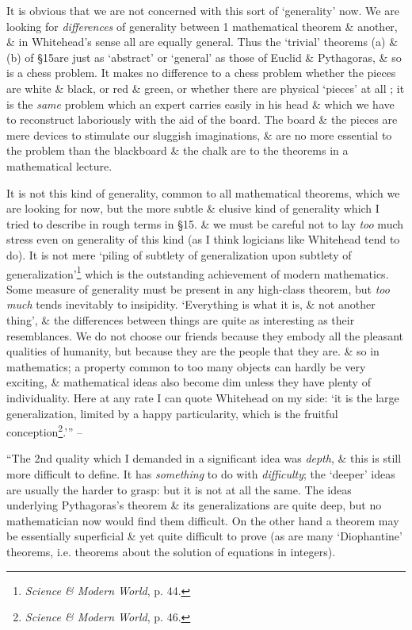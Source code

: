 \documentclass{article}
\numberwithin{equation}{section}
\begin{document}
It is obvious that we are not concerned with this sort of `generality' now. We are looking for \textit{differences} of generality between 1 mathematical theorem \& another, \& in Whitehead's sense all are equally general. Thus the `trivial' theorems (a) \& (b) of \S15are just as `abstract' or `general' as those of Euclid \& Pythagoras, \& so is a chess problem. It makes no difference to a chess problem whether the pieces are white \& black, or red \& green, or whether there are physical `pieces' at all ; it is the \textit{same} problem which an expert carries easily in his head \& which we have to reconstruct laboriously with the aid of the board. The board \& the pieces are mere devices to stimulate our sluggish imaginations, \& are no more essential to the problem than the blackboard \& the chalk are to the theorems in a mathematical lecture.

It is not this kind of generality, common to all mathematical theorems, which we are looking for now, but the more subtle \& elusive kind of generality which I tried to describe in rough terms in \S15. \& we must be careful not to lay \textit{too} much stress even on generality of this kind (as I think logicians like Whitehead tend to do). It is not mere `piling of subtlety of generalization upon subtlety of generalization'\footnote{\textit{Science \& Modern World}, p. 44.} which is the outstanding achievement of modern mathematics. Some measure of generality must be present in any high-class theorem, but \textit{too much} tends inevitably to insipidity. `Everything is what it is, \& not another thing', \& the differences between things are quite as interesting as their resemblances. We do not choose our friends because they embody all the pleasant qualities of humanity, but because they are the people that they are. \& so in mathematics; a property common to too many objects can hardly be very exciting, \& mathematical ideas also become dim unless they have plenty of individuality. Here at any rate I can quote Whitehead on my side: `it is the large generalization, limited by a happy particularity, which is the fruitful conception\footnote{\textit{Science \& Modern World}, p. 46.}.''' -- \cite[pp. 105--109]{Hardy1992}

 ``The 2nd quality which I demanded in a significant idea was \textit{depth}, \& this is still more difficult to define. It has \textit{something} to do with \textit{difficulty}; the `deeper' ideas are usually the harder to grasp: but it is not at all the same. The ideas underlying Pythagoras's theorem \& its generalizations are quite deep, but no mathematician now would find them difficult. On the other hand a theorem may be essentially superficial \& yet quite difficult to prove (as are many `Diophantine' theorems, i.e. theorems about the solution of equations in integers).
\end{document}
